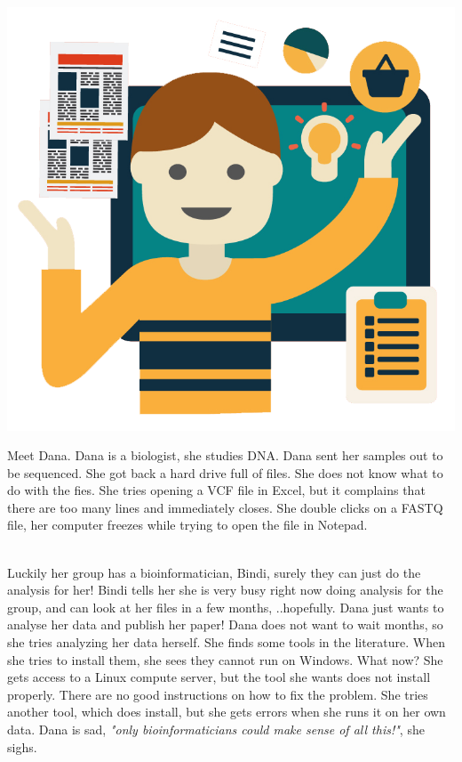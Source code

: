 \begin{center}
\begin{minipage}{5in}
\begin{center}
{\small
\includegraphics[scale=0.1]{chapters/images/discussion/dana.png}

\vspace*{0.5cm}

Meet Dana. Dana is a biologist, she studies DNA. Dana sent her samples out to be sequenced. She got back a hard drive full of files. She does not know what to do with the fies. She tries opening a VCF file in Excel, but it complains that there are too many lines and immediately closes. She double clicks on a FASTQ file, her computer freezes while trying to open the file in Notepad.

\ \\
Luckily her group has a bioinformatician, Bindi, surely they can just do the analysis for her! Bindi tells her she is very busy right now doing analysis for the group, and can look at her files in a few months, ..hopefully. Dana just wants to analyse her data and publish her paper! Dana does not want to wait months, so she tries analyzing her data herself. She finds some tools in the literature. When she tries to install them, she sees they cannot run on Windows. What now? She gets access to a Linux compute server, but the tool she wants does not install properly. There are no good instructions on how to fix the problem. She tries another tool, which does install, but she gets errors when she runs it on her own data. Dana is sad, \emph{"only bioinformaticians could make sense of all this!"}, she sighs.

}
\end{center}
\end{minipage}
\end{center}
